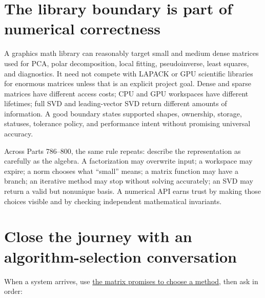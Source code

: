 \section{The library boundary is part of numerical correctness}\label{02-foundations-ii-ch038-the-library-boundary-is-part-of-numerical-correctness}

A graphics math library can reasonably target small and medium dense matrices used for PCA, polar decomposition, local fitting, pseudoinverse, least squares, and diagnostics. It need not compete with LAPACK or GPU scientific libraries for enormous matrices unless that is an explicit project goal. Dense and sparse matrices have different access costs; CPU and GPU workspaces have different lifetimes; full SVD and leading-vector SVD return different amounts of information. A good boundary states supported shapes, ownership, storage, statuses, tolerance policy, and performance intent without promising universal accuracy.

Across Parts 786--800, the same rule repeats: describe the representation as carefully as the algebra. A factorization may overwrite input; a workspace may expire; a norm chooses what ``small'' means; a matrix function may have a branch; an iterative method may stop without solving accurately; an SVD may return a valid but nonunique basis. A numerical API earns trust by making those choices visible and by checking independent mathematical invariants.

\section{Close the journey with an algorithm-selection conversation}\label{02-foundations-ii-ch038-close-the-journey-with-an-algorithm-selection-conversation}

When a system arrives, use \hyperref[02-foundations-ii-ch038-choose-a-factorization-from-structure-and-the-requested-answer]{the matrix promises to choose a method}, then ask in order:

